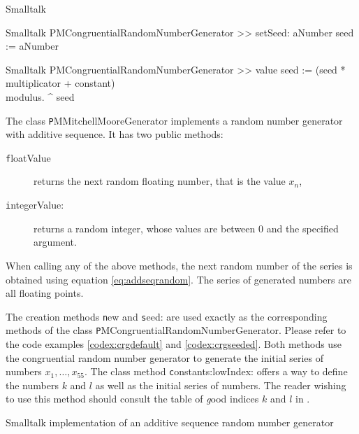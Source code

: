 \begin{displaycode}{Smalltalk}
\begin{displaycode}{Smalltalk}
PMCongruentialRandomNumberGenerator >> setSeed: aNumber
    seed := aNumber
\end{displaycode}

\begin{displaycode}{Smalltalk}
PMCongruentialRandomNumberGenerator >> value
    seed := (seed * multiplicator + constant) \\ modulus.
    ^ seed
\end{displaycode}

%

\noindent The class {\texttt PMMitchellMooreGenerator} implements a
random number generator with additive sequence. It has two public
methods:
\begin{description}
  \item[\texttt floatValue] returns the next random floating number,
  that is the value $x_n$,
  \item[\texttt integerValue:] returns a random integer, whose values
  are between 0 and the specified argument.
\end{description}
When calling any of the above methods, the next random number of
the series is obtained using equation \ref{eq:addseqrandom}. The
series of generated numbers are all floating points.

The creation methods {\texttt new} and {\texttt seed:} are used exactly as
the corresponding methods of the class {\texttt
PMCongruentialRandomNumberGenerator}. Please refer to the code
examples \ref{codex:crgdefault} and \ref{codex:crgseeded}. Both
methods use the congruential random number generator to generate
the initial series of numbers $x_1,\ldots,x_{55}$. The class
method {\texttt constants:lowIndex:} offers a way to define the
numbers $k$ and $l$ as well as the initial series of numbers. The
reader wishing to use this method should consult the table of {\textsl
good} indices $k$ and $l$ in \cite{Knuth2}.

\begin{listing} Smalltalk implementation of an additive sequence random number generator
\label{ls:randomseq}
%
\end{listing}


\end{displaycode}
